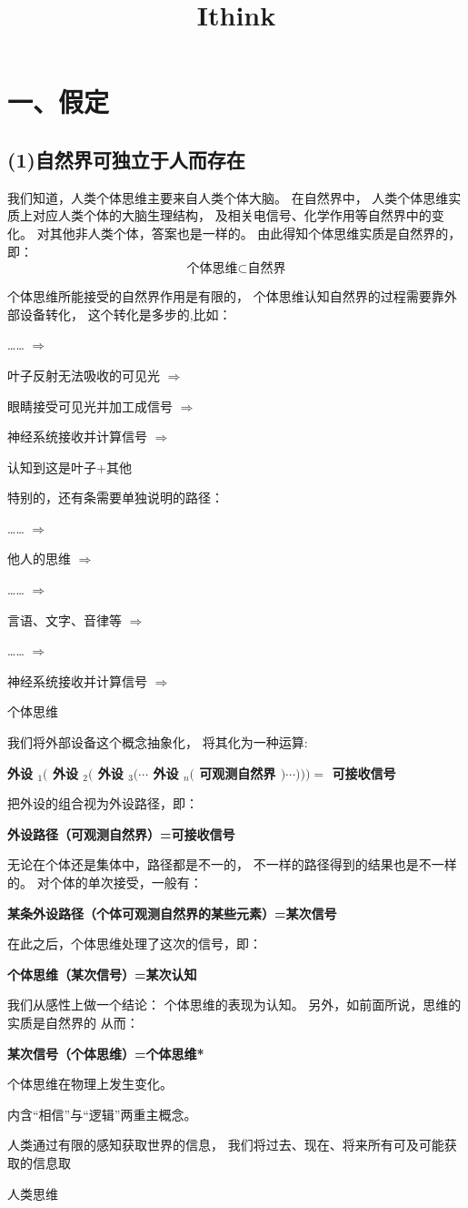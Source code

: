 \documentclass[fontset=windows, 12pt, a4paper]{article}
\date{}
\title{Ithink}
\begin{document}
\maketitle

\section*{一、假定}
\subsection*{(1)自然界可独立于人而存在}

我们知道，人类个体思维主要来自人类个体大脑。
在自然界中，
人类个体思维实质上对应人类个体的大脑生理结构，
及相关电信号、化学作用等自然界中的变化。
对其他非人类个体，答案也是一样的。
由此得知个体思维实质是自然界的，即：
$$\pmb{\mbox{个体思维} \subset \mbox{自然界}}$$

个体思维所能接受的自然界作用是有限的，
个体思维认知自然界的过程需要靠外部设备转化，
这个转化是多步的,比如：\par
\begin{center}
    ……
    $\Rightarrow$\par
    叶子反射无法吸收的可见光
    $\Rightarrow$\par
    眼睛接受可见光并加工成信号
    $\Rightarrow$\par
    神经系统接收并计算信号
    $\Rightarrow$\par
    认知到这是叶子+其他
\end{center}
特别的，还有条需要单独说明的路径：\par
\begin{center}
    ……
    $\Rightarrow$\par
    他人的思维
    $\Rightarrow$\par
    ……
    $\Rightarrow$\par
    言语、文字、音律等
    $\Rightarrow$\par
    ……
    $\Rightarrow$\par
    神经系统接收并计算信号
    $\Rightarrow$\par
    个体思维
\end{center}

我们将外部设备这个概念抽象化，
将其化为一种运算:\par
\centerline{\textbf{
    外设 $_1($ 外设 $_2($ 外设 $_3(\cdots$
    外设 $_n($ 可观测自然界 $)\cdots)))=$
    可接收信号
}}
把外设的组合视为外设路径，即：\par
\centerline{\textbf{
    外设路径（可观测自然界）=可接收信号
}}
无论在个体还是集体中，路径都是不一的，
不一样的路径得到的结果也是不一样的。
对个体的单次接受，一般有：\par
\centerline{\textbf{
    某条外设路径（个体可观测自然界的某些元素）=某次信号
}}
在此之后，个体思维处理了这次的信号，即：\par
\centerline{\textbf{
    个体思维（某次信号）=某次认知
}}
我们从感性上做一个结论：
个体思维的表现为认知。
另外，如前面所说，思维的实质是自然界的
从而：\par
\centerline{\textbf{
    某次信号（个体思维）=个体思维*
}}
个体思维在物理上发生变化。

内含“相信”与“逻辑”两重主概念。

人类通过有限的感知获取世界的信息，
我们将过去、现在、将来所有可及可能获取的信息取


人类思维

% 

\end{document}
